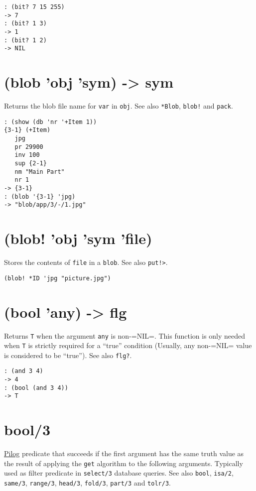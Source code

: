 {\begin{verbatim}
: (bit? 7 15 255)
-> 7
: (bit? 1 3)
-> 1
: (bit? 1 2)
-> NIL
\end{verbatim}

 
\section{(blob 'obj 'sym) -> sym}
\label{sec-8-1-2-13}


Returns the blob file name for \texttt{var} in \texttt{obj}. See also \texttt{*Blob}, \texttt{blob!}
and \texttt{pack}.


\begin{verbatim}
: (show (db 'nr '+Item 1))
{3-1} (+Item)
   jpg
   pr 29900
   inv 100
   sup {2-1}
   nm "Main Part"
   nr 1
-> {3-1}
: (blob '{3-1} 'jpg)
-> "blob/app/3/-/1.jpg"
\end{verbatim}

 
\section{(blob! 'obj 'sym 'file)}
\label{sec-8-1-2-14}


Stores the contents of \texttt{file} in a \texttt{blob}. See also \texttt{put!>}.


\begin{verbatim}
(blob! *ID 'jpg "picture.jpg")
\end{verbatim}

 
\section{(bool 'any) -> flg}
\label{sec-8-1-2-15}


Returns \texttt{T} when the argument \texttt{any} is non-=NIL=. This function is only
needed when \texttt{T} is strictly required for a ``true'' condition (Usually,
any non-=NIL= value is considered to be ``true''). See also \texttt{flg?}.


\begin{verbatim}
: (and 3 4)
-> 4
: (bool (and 3 4))
-> T
\end{verbatim}

 
\section{bool/3}
\label{sec-8-1-2-16}


\hyperref[ref.html-pilog]{Pilog} predicate that succeeds if the first argument
has the same truth value as the result of applying the \texttt{get} algorithm
to the following arguments. Typically used as filter predicate in
\texttt{select/3} database queries. See also \texttt{bool}, \texttt{isa/2}, \texttt{same/3},
\texttt{range/3}, \texttt{head/3}, \texttt{fold/3}, \texttt{part/3} and \texttt{tolr/3}.


}
